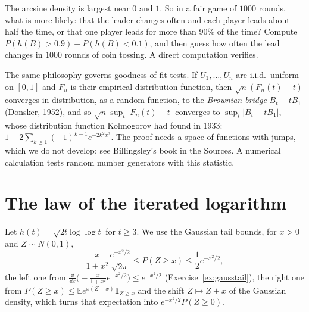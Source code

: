 \begin{think}
The arcsine density is largest near $0$ and $1$. So in a fair game of $1000$ rounds, what is more likely: that the leader changes often and each player leads about half the
time, or that one player leads for more than $90\%$ of the time? Compute $P(h(B)>0.9)+P(h(B)<0.1)$, and then guess how often the lead changes in $1000$ rounds of
coin tossing. A direct computation verifies.
\end{think}

\begin{remark}
The same philosophy governs goodness-of-fit tests. If $U_1,\dots,U_n$ are i.i.d.\ uniform on $[0,1]$ and $F_n$ is their empirical distribution function, then
$\sqrt n(F_n(t)-t)$ converges in distribution, as a random function, to the \emph{Brownian bridge} $B_t-tB_1$ (Donsker, 1952), and so
$\sqrt n\sup_t|F_n(t)-t|$ converges to $\sup_t|B_t-tB_1|$, whose distribution function Kolmogorov had found in 1933:
$1-2\sum_{k\ge1}(-1)^{k-1}e^{-2k^2x^2}$. The proof needs a space of functions with jumps, which we do not develop; see Billingsley's book in the Sources. A numerical calculation tests
random number generators with this statistic.
\end{remark}

\section{The law of the iterated logarithm}

Let $h(t)=\sqrt{2t\log\log t}$ for $t\ge3$. We use the Gaussian tail bounds, for $x>0$ and $Z\sim N(0,1)$,
\begin{equation}\label{eq:gausstail}
\frac x{1+x^2}\frac{e^{-x^2/2}}{\sqrt{2\pi}}\le P(Z\ge x)\le\frac12e^{-x^2/2},
\end{equation}
the left one from $\frac{\dd}{\dd x}\bigl(-\frac x{1+x^2}e^{-x^2/2}\bigr)\le e^{-x^2/2}$ (Exercise~\ref{ex:gausstail}), the right one from $P(Z\ge x)\le\mathbb E e^{x(Z-x)}\mathbf 1_{Z\ge x}$
and the shift $Z\mapsto Z+x$ of the Gaussian density, which turns that expectation into $e^{-x^2/2}P(Z\ge0)$.

